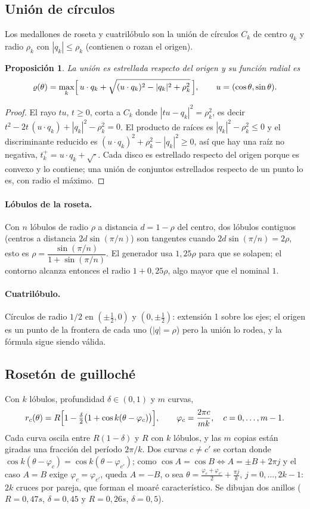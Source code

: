 \documentclass[11pt,a4paper]{article}
\theoremstyle{definition}
\theoremstyle{plain}
\newtheorem{proposicion}{Proposición}[section]
\theoremstyle{remark}
\begin{document}
\subsection{Unión de círculos}
Los medallones de roseta y cuatrilóbulo son la unión de círculos $C_k$ de centro
$q_k$ y radio $\rho_k$ con $|q_k|\le\rho_k$ (contienen o rozan el origen).

\begin{proposicion}
La unión es estrellada respecto del origen y su función radial es
\[
  \varrho(\theta)=\max_k\Bigl[\,u\cdot q_k+\sqrt{(u\cdot q_k)^2-|q_k|^2+\rho_k^2}\,\Bigr],
  \qquad u=(\cos\theta,\sin\theta).
\]
\end{proposicion}
\begin{proof}
El rayo $tu$, $t\ge0$, corta a $C_k$ donde $|tu-q_k|^2=\rho_k^2$, es decir
$t^2-2t\,(u\cdot q_k)+|q_k|^2-\rho_k^2=0$. El producto de raíces es
$|q_k|^2-\rho_k^2\le0$ y el discriminante reducido es $(u\cdot q_k)^2+\rho_k^2-|q_k|^2\ge0$,
así que hay una raíz no negativa, $t_k^+=u\cdot q_k+\sqrt{\cdot}$. Cada disco es
estrellado respecto del origen porque es convexo y lo contiene; una unión de
conjuntos estrellados respecto de un punto lo es, con radio el máximo.
\end{proof}

\paragraph{Lóbulos de la roseta.} Con $n$ lóbulos de radio $\rho$ a distancia
$d=1-\rho$ del centro, dos lóbulos contiguos (centros a distancia $2d\sin(\pi/n)$)
son tangentes cuando $2d\sin(\pi/n)=2\rho$, esto es
$\rho=\dfrac{\sin(\pi/n)}{1+\sin(\pi/n)}$. El generador usa $1{,}25\rho$ para que se
solapen; el contorno alcanza entonces el radio $1+0{,}25\rho$, algo mayor que el
nominal $1$.

\paragraph{Cuatrilóbulo.} Círculos de radio $1/2$ en $(\pm\tfrac12,0)$ y
$(0,\pm\tfrac12)$: extensión 1 sobre los ejes; el origen es un punto de la
frontera de cada uno ($|q|=\rho$) pero la unión lo rodea, y la fórmula sigue
siendo válida.

\subsection{Rosetón de guilloché}
Con $k$ lóbulos, profundidad $\delta\in(0,1)$ y $m$ curvas,
\[
  r_c(\theta)=R\Bigl[1-\tfrac{\delta}{2}\bigl(1+\cos k(\theta-\varphi_c)\bigr)\Bigr],
  \qquad \varphi_c=\frac{2\pi c}{mk},\quad c=0,\dots,m-1.
\]
Cada curva oscila entre $R(1-\delta)$ y $R$ con $k$ lóbulos, y las $m$ copias
están giradas una fracción del período $2\pi/k$. Dos curvas $c\ne c'$ se cortan
donde $\cos k(\theta-\varphi_c)=\cos k(\theta-\varphi_{c'})$; como
$\cos A=\cos B\iff A=\pm B+2\pi j$ y el caso $A=B$ exige $\varphi_c=\varphi_{c'}$,
queda $A=-B$, o sea $\theta=\tfrac{\varphi_c+\varphi_{c'}}2+\tfrac{\pi j}{k}$,
$j=0,\dots,2k-1$: $2k$ cruces por pareja, que forman el moaré característico. Se
dibujan dos anillos ($R=0{,}47s$, $\delta=0{,}45$ y $R=0{,}26s$, $\delta=0{,}5$).
\end{document}
